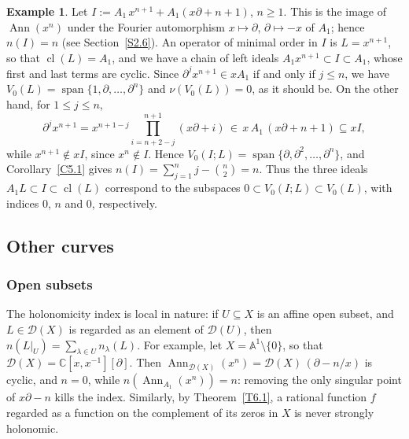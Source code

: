 \documentclass[11pt,reqno]{amsart}
\theoremstyle{plain}
\theoremstyle{definition}
\newtheorem{example}{Example}[section]
\theoremstyle{remark}
\numberwithin{equation}{section}
\newcommand{\cD}{\mathcal{D}}
\newcommand{\C}{\mathbb{C}}
\newcommand{\A}{\mathbb{A}}
\newcommand{\del}{\partial}
\DeclareMathOperator{\Ann}{Ann}
\DeclareMathOperator{\cl}{cl}
\DeclareMathOperator{\spn}{span}
\begin{document}
\begin{example}
\label{Ex6.10}
Let $I := A_1\, x^{n+1} + A_1 (x \del + n + 1)$, $n \ge 1$. This is the image of $\Ann(x^n)$ under
the Fourier automorphism $x \mapsto \del$, $\del \mapsto -x$ of $A_1$; hence $n(I) = n$ (see
Section~\ref{S2.6}). An operator of minimal order in $I$ is $L = x^{n+1}$, so that $\cl(L) = A_1$,
and we have a chain of left ideals $A_1 x^{n+1} \subset I \subset A_1$, whose first and last terms
are cyclic. Since $\del^j x^{n+1} \in x A_1$ if and only if $j \le n$, we have $V_0(L) =
\spn\{1, \del, \ldots, \del^n\}$ and $\nu(V_0(L)) = 0$, as it should be. On the other hand, for
$1 \le j \le n$,
\[
  \del^j x^{n+1} = x^{n+1-j} \prod_{i = n+2-j}^{n+1} (x \del + i) \, \in \, x\, A_1\, (x \del +
  n + 1) \subseteq x I ,
\]
while $x^{n+1} \notin x I$, since $x^n \notin I$. Hence $V_0(I; L) = \spn\{\del, \del^2, \ldots,
\del^n\}$, and Corollary~\ref{C5.1} gives $n(I) = \sum_{j=1}^n j - \binom{n}{2} = n$. Thus the three
ideals $A_1 L \subset I \subset \cl(L)$ correspond to the subspaces $0 \subset V_0(I;L) \subset
V_0(L)$, with indices $0$, $n$ and $0$, respectively.
\end{example}

\subsection{Other curves}
\label{S6.5}

\subsubsection{Open subsets}
The holonomicity index is local in nature: if $U \subseteq X$ is an affine open subset, and
$L \in \cD(X)$ is regarded as an element of $\cD(U)$, then $n(L|_U) = \sum_{\lambda \in U}
n_\lambda(L)$. For example, let $X = \A^1 \setminus \{0\}$, so that $\cD(X) = \C[x, x^{-1}][\del]$.
Then $\Ann_{\cD(X)}(x^n) = \cD(X)\, (\del - n/x)$ is cyclic, and $n = 0$, while $n(\Ann_{A_1}(x^n))
= n$: removing the only singular point of $x \del - n$ kills the index. Similarly, by
Theorem~\ref{T6.1}, a rational function $f$ regarded as a function on the complement of its
zeros in $X$ is never strongly holonomic.
\end{document}

